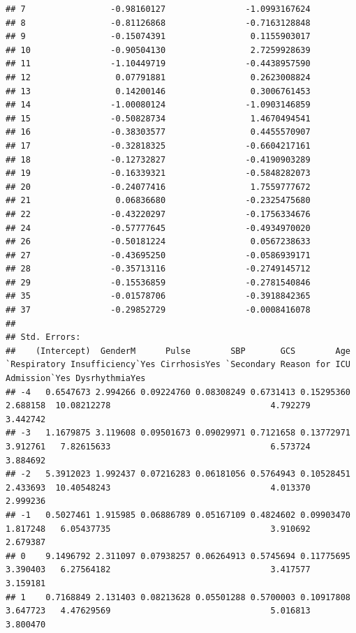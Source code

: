 \documentclass[
]{article}
\begin{document}
\begin{verbatim}
## 7                 -0.98160127                -1.0993167624
## 8                 -0.81126868                -0.7163128848
## 9                 -0.15074391                 0.1155903017
## 10                -0.90504130                 2.7259928639
## 11                -1.10449719                -0.4438957590
## 12                 0.07791881                 0.2623008824
## 13                 0.14200146                 0.3006761453
## 14                -1.00080124                -1.0903146859
## 15                -0.50828734                 1.4670494541
## 16                -0.38303577                 0.4455570907
## 17                -0.32818325                -0.6604217161
## 18                -0.12732827                -0.4190903289
## 19                -0.16339321                -0.5848282073
## 20                -0.24077416                 1.7559777672
## 21                 0.06836680                -0.2325475680
## 22                -0.43220297                -0.1756334676
## 24                -0.57777645                -0.4934970020
## 26                -0.50181224                 0.0567238633
## 27                -0.43695250                -0.0586939171
## 28                -0.35713116                -0.2749145712
## 29                -0.15536859                -0.2781540846
## 35                -0.01578706                -0.3918842365
## 37                -0.29852729                -0.0008416078
## 
## Std. Errors:
##    (Intercept)  GenderM      Pulse        SBP       GCS        Age `Respiratory Insufficiency`Yes CirrhosisYes `Secondary Reason for ICU Admission`Yes DysrhythmiaYes
## -4   0.6547673 2.994266 0.09224760 0.08308249 0.6731413 0.15295360                       2.688158  10.08212278                                4.792279       3.442742
## -3   1.1679875 3.119608 0.09501673 0.09029971 0.7121658 0.13772971                       3.912761   7.82615633                                6.573724       3.884692
## -2   5.3912023 1.992437 0.07216283 0.06181056 0.5764943 0.10528451                       2.433693  10.40548243                                4.013370       2.999236
## -1   0.5027461 1.915985 0.06886789 0.05167109 0.4824602 0.09903470                       1.817248   6.05437735                                3.910692       2.679387
## 0    9.1496792 2.311097 0.07938257 0.06264913 0.5745694 0.11775695                       3.390403   6.27564182                                3.417577       3.159181
## 1    0.7168849 2.131403 0.08213628 0.05501288 0.5700003 0.10917808                       3.647723   4.47629569                                5.016813       3.800470

\end{verbatim}
\end{document}
